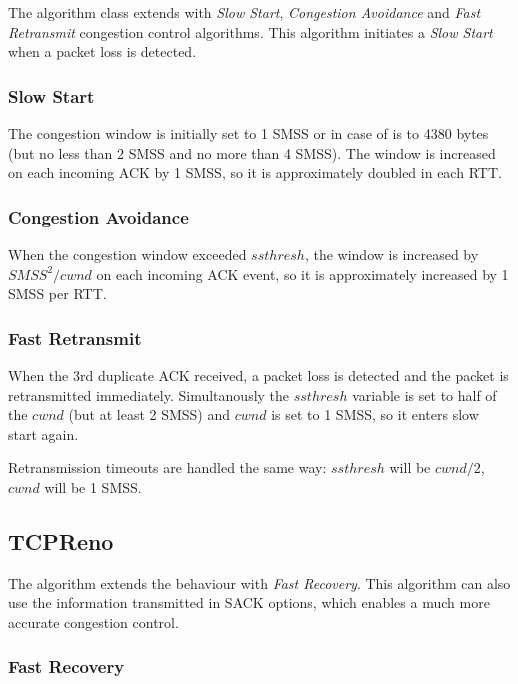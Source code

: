 The  algorithm class extends 
with \emph{Slow Start}, \emph{Congestion Avoidance} and
\emph{Fast Retransmit} congestion control algorithms.
This algorithm initiates a \emph{Slow Start} when a packet
loss is detected.

\subsubsection*{Slow Start}

The congestion window is initially set to 1 SMSS or in case of
 is  to 4380 bytes
(but no less than 2 SMSS and no more than 4 SMSS). The window
is increased on each incoming ACK by 1 SMSS, so it is approximately
doubled in each RTT.

\subsubsection*{Congestion Avoidance}

When the congestion window exceeded $ssthresh$, the window
is increased by $SMSS^2/cwnd$ on each incoming ACK event, so
it is approximately increased by 1 SMSS per RTT.

\subsubsection*{Fast Retransmit}

When the 3rd duplicate ACK received, a packet loss is detected
and the packet is retransmitted immediately. Simultanously
the $ssthresh$ variable is set to half of the $cwnd$ (but at least 2 SMSS)
and $cwnd$ is set to 1 SMSS, so it enters slow start again.

Retransmission timeouts are handled the same way:
$ssthresh$ will be $cwnd/2$, $cwnd$ will be 1 SMSS.

\subsection{TCPReno}

The  algorithm extends the behaviour 
with \emph{Fast Recovery}. This algorithm can also use the information
transmitted in SACK options, which enables a much more accurate
congestion control.

\subsubsection*{Fast Recovery}

